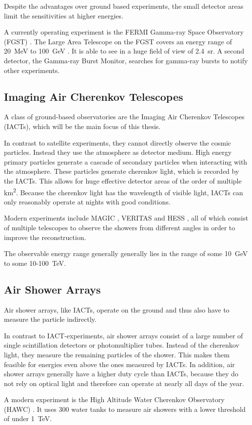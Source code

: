 Despite the advantages over ground based experiments, the small detector areas 
limit the sensitivities at higher energies.

A currently operating experiment is the FERMI Gamma-ray Space Observatory (FGST) \cite{Atwood_2009}.
The Large Area Telescope on 
the FGST covers an energy range of
\SI{20}{\mega\electronvolt} to \SI{100}{\giga\electronvolt} \cite{Atwood_2009}.
It is able to see in a huge field of view of 
\SI{2.4}{\steradian}. A second detector, the Gamma-ray Burst Monitor,
searches for gamma-ray bursts to notify other experiments.

\subsection{Imaging Air Cherenkov Telescopes}
A class of ground-based observatories are the 
Imaging Air Cherenkov Telescopes (IACTs),
which will be the main focus of this thesis.

In contrast to satellite experiments, they cannot directly
observe the cosmic particles. Instead they use the atmosphere as detector medium.
High energy primary particles generate a cascade of secondary particles
when interacting with the atmosphere. These particles generate cherenkov
light, which is recorded by the IACTs.
This allows for huge effective detector areas of the order of
multiple \si{\square\kilo\meter}.
Because the cherenkov light has the wavelength of visible light,
IACTs can only reasonably operate at nights with good conditions.

Modern experiments include 
MAGIC \cite{ALEKSIC2012435},
VERITAS \cite{WEEKES2002221}
and HESS \cite{vincent2005hess},
all of which consist of multiple telescopes to observe the showers
from different angles in order to improve the reconstruction.

The observable energy range generally generally lies in the range of
some \SI{10}{\giga\electronvolt} to some 10-\SI{100}{\tera\electronvolt}.

\subsection{Air Shower Arrays}
Air shower arrays, like IACTs, operate on the ground and thus also have 
to measure the particle indirectly.

In contrast to IACT-experiments, air shower arrays consist of a large
number of single scintillation detectors or photomultiplier tubes.
Instead of the cherenkov light, they measure the
remaining particles of the shower. This makes them feasible
for energies even above the ones measured by IACTs.
In addition, air shower arrays generally have a higher duty cycle than
IACTs, because they do not rely on optical light and therefore can operate
at nearly all days of the year.

A modern experiment is the High Altitude Water Cherenkov Observatory (HAWC) \cite{2015ICRC...34..966S}.
It uses \num{300} water tanks to measure air showers with a lower threshold
of under \SI{1}{\tera\electronvolt}.
